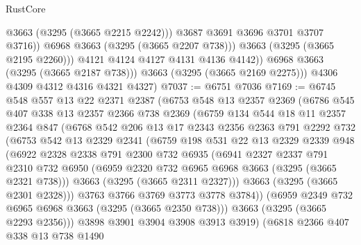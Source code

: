 \begin{lexlean}{RustCore}
\begin{coremodule}
                        @3663
                        (@3295 (@3665 @2215 @2242)))
                      @3687
                      @3691
                      @3696
                      @3701
                      @3707
                      @3716))
                  @6968
                  @3663
                  (@3295 (@3665 @2207 @738)))
                @3663
                (@3295 (@3665 @2195 @2260)))
              @4121
              @4124
              @4127
              @4131
              @4136
              @4142))
          @6968
          @3663
          (@3295 (@3665 @2187 @738)))
        @3663
        (@3295 (@3665 @2169 @2275)))
      @4306
      @4309
      @4312
      @4316
      @4321
      @4327)
@7037 := @6751 @7036
@7169 := @6745
    @548
    @557
    @13
    @22
    @2371
    @2387
    (@6753
      @548
      @13
      @2357
      @2369
      (@6786
        @545
        @407
        @338
        @13
        @2357
        @2366
        @738
        @2369
        (@6759
          @134
          @544
          @18
          @11
          @2357
          @2364
          @847
          (@6768
            @542
            @206
            @13
            @17
            @2343
            @2356
            @2363
            @791
            @2292
            @732
            (@6753
              @542
              @13
              @2329
              @2341
              (@6759
                @198
                @531
                @22
                @13
                @2329
                @2339
                @948
                (@6922
                  @2328
                  @2338
                  @791
                  @2300
                  @732
                  @6935
                  (@6941
                    @2327
                    @2337
                    @791
                    @2310
                    @732
                    @6950
                    (@6959 @2320 @732 @6965 @6968 @3663 (@3295 (@3665 @2321 @738)))
                    @3663
                    (@3295 (@3665 @2311 @2327)))
                  @3663
                  (@3295 (@3665 @2301 @2328)))
                @3763
                @3766
                @3769
                @3773
                @3778
                @3784))
            (@6959 @2349 @732 @6965 @6968 @3663 (@3295 (@3665 @2350 @738)))
            @3663
            (@3295 (@3665 @2293 @2356)))
          @3898
          @3901
          @3904
          @3908
          @3913
          @3919)
        (@6818
          @2366
          @407
          @338
          @13
          @738
          @1490

\end{coremodule}
\end{lexlean}
